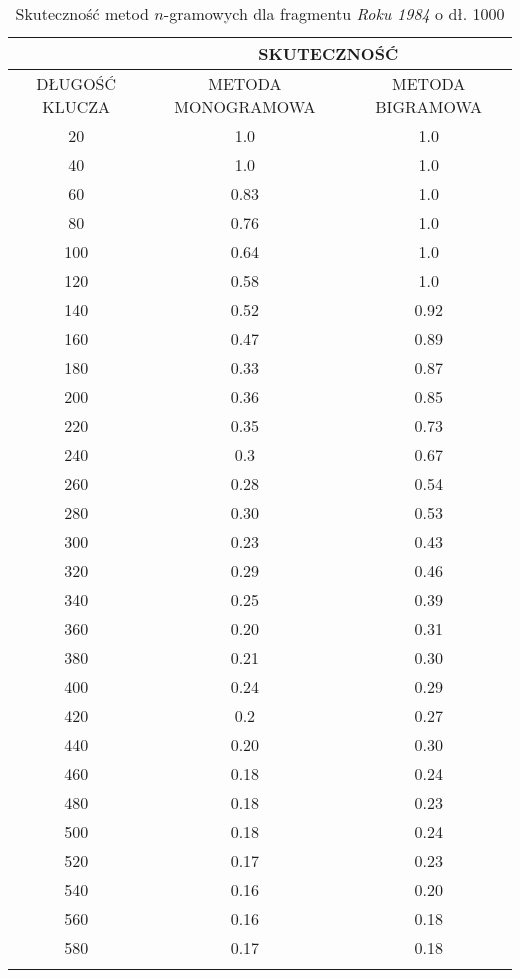 \documentclass[a4paper]{article}
\theoremstyle{defn}
\theoremstyle{theorem}
\theoremstyle{lemma}
\theoremstyle{cor}
\theoremstyle{fact}
\begin{document}
\begin{center}\begin{longtable}{
|c|c|c|}
\hline &\multicolumn{2}{|c|}{SKUTECZNOŚĆ} \\ 
\hline DŁUGOŚĆ KLUCZA & METODA MONOGRAMOWA & METODA BIGRAMOWA\\ \hline
20
 & 1.0 & 1.0\\ \hline
40
 & 1.0 & 1.0\\ \hline
60
 & 0.83 & 1.0\\ \hline
80
 & 0.76 & 1.0\\ \hline
100
 & 0.64 & 1.0\\ \hline
120
 & 0.58 & 1.0\\ \hline
140
 & 0.52 & 0.92\\ \hline
160
 & 0.47 & 0.89\\ \hline
180
 & 0.33 & 0.87\\ \hline
200
 & 0.36 & 0.85\\ \hline
220
 & 0.35 & 0.73\\ \hline
240
 & 0.3 & 0.67\\ \hline
260
 & 0.28 & 0.54\\ \hline
280
 & 0.30 & 0.53\\ \hline
300
 & 0.23 & 0.43\\ \hline
320
 & 0.29 & 0.46\\ \hline
340
 & 0.25 & 0.39\\ \hline
360
 & 0.20 & 0.31\\ \hline
380
 & 0.21 & 0.30\\ \hline
400
 & 0.24 & 0.29\\ \hline
420
 & 0.2 & 0.27\\ \hline
440
 & 0.20 & 0.30\\ \hline
460
 & 0.18 & 0.24\\ \hline
480
 & 0.18 & 0.23\\ \hline
500
 & 0.18 & 0.24\\ \hline
520
 & 0.17 & 0.23\\ \hline
540
 & 0.16 & 0.20\\ \hline
560
 & 0.16 & 0.18\\ \hline
580
 & 0.17 & 0.18\\ \hline
   \caption{Skuteczność metod $n$-gramowych dla fragmentu \textit{Roku 1984} o dł. 1000}
\end{longtable}\end{center}
\end{document}

